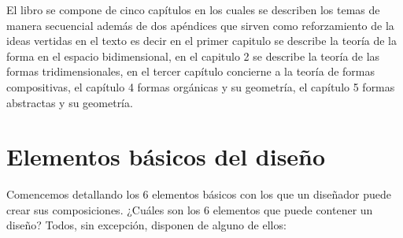 \documentclass[
  16pt,
]{krantz}
\theoremstyle{definition}
\theoremstyle{definition}
\theoremstyle{definition}
\theoremstyle{definition}
\theoremstyle{remark}
\begin{document}
El libro se compone de cinco capítulos en los cuales se describen los temas de manera secuencial además de dos apéndices que sirven como reforzamiento de la ideas vertidas en el texto es decir en el primer capitulo se describe la teoría de la forma en el espacio bidimensional, en el capitulo 2 se describe la teoría de las formas tridimensionales, en el tercer capítulo concierne a la teoría de formas compositivas, el capítulo 4 formas orgánicas y su geometría, el capítulo 5 formas abstractas y su geometría.

\mainmatter

\hypertarget{elementos-buxe1sicos-del-diseuxf1o}{%
\chapter{Elementos básicos del diseño}\label{elementos-buxe1sicos-del-diseuxf1o}}

Comencemos detallando los 6 elementos básicos con los que un diseñador puede crear sus composiciones. ¿Cuáles son los 6 elementos que puede contener un diseño? Todos, sin excepción, disponen de alguno de ellos:
\end{document}
